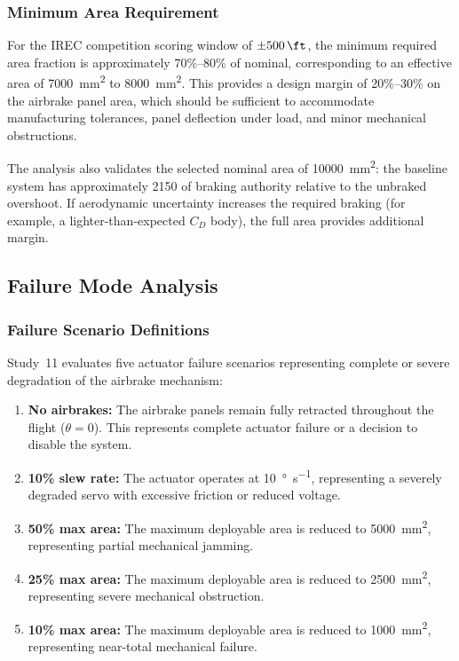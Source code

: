 \documentclass[11pt,letterpaper]{article}
\newcommand{\Cd}{C_D}
\begin{document}
\subsubsection{Minimum Area Requirement}

For the IREC competition scoring window of $\pm\SI{500}{\ft}$, the minimum required area fraction is approximately 70\%--80\% of nominal, corresponding to an effective area of \SI{7000}{\milli\metre\squared} to \SI{8000}{\milli\metre\squared}. This provides a design margin of 20\%--30\% on the airbrake panel area, which should be sufficient to accommodate manufacturing tolerances, panel deflection under load, and minor mechanical obstructions.

The analysis also validates the selected nominal area of \SI{10000}{\milli\metre\squared}: the baseline system has approximately \SI{2150}{\ft} of braking authority relative to the unbraked overshoot. If aerodynamic uncertainty increases the required braking (for example, a lighter-than-expected $\Cd$ body), the full area provides additional margin.

\subsection{Failure Mode Analysis}
\label{sec:actuator_failure}

\subsubsection{Failure Scenario Definitions}

Study~11 evaluates five actuator failure scenarios representing complete or severe degradation of the airbrake mechanism:

\begin{enumerate}[nosep]
    \item \textbf{No airbrakes:} The airbrake panels remain fully retracted throughout the flight ($\theta = 0$). This represents complete actuator failure or a decision to disable the system.
    \item \textbf{10\% slew rate:} The actuator operates at \SI{10}{\degree\per\second}, representing a severely degraded servo with excessive friction or reduced voltage.
    \item \textbf{50\% max area:} The maximum deployable area is reduced to \SI{5000}{\milli\metre\squared}, representing partial mechanical jamming.
    \item \textbf{25\% max area:} The maximum deployable area is reduced to \SI{2500}{\milli\metre\squared}, representing severe mechanical obstruction.
    \item \textbf{10\% max area:} The maximum deployable area is reduced to \SI{1000}{\milli\metre\squared}, representing near-total mechanical failure.
\end{enumerate}
\end{document}
